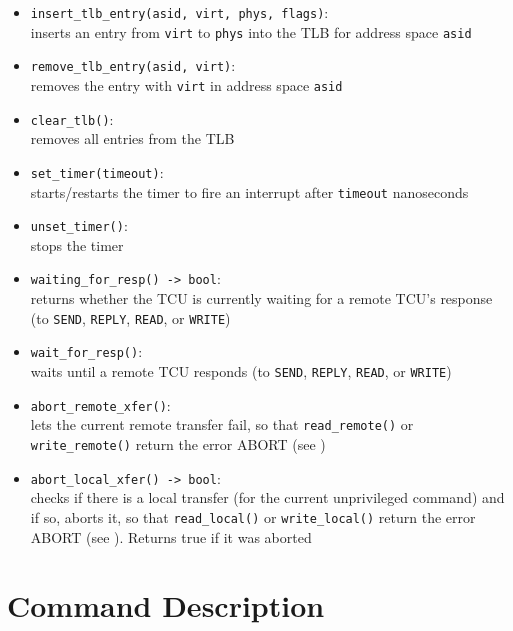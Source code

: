 \begin{itemize}
  \item \texttt{insert\_tlb\_entry(asid, virt, phys, flags)}: \\
  inserts an entry from \texttt{virt} to \texttt{phys} into the TLB for address space \texttt{asid}
  \item \texttt{remove\_tlb\_entry(asid, virt)}:\\
  removes the entry with \texttt{virt} in address space \texttt{asid}
  \item \texttt{clear\_tlb()}:\\
  removes all entries from the TLB \extend{}
  \item \texttt{set\_timer(timeout)}:\\
  starts/restarts the timer to fire an interrupt after \texttt{timeout} nanoseconds
  \item \texttt{unset\_timer()}:\\
  stops the timer
  \item \texttt{waiting\_for\_resp() -> bool}:\\
  returns whether the TCU is currently waiting for a remote TCU's response (to \texttt{SEND},
  \texttt{REPLY}, \texttt{READ}, or \texttt{WRITE})
  \item \texttt{wait\_for\_resp()}:\\
  waits until a remote TCU responds (to \texttt{SEND}, \texttt{REPLY}, \texttt{READ}, or
  \texttt{WRITE})
  \item \texttt{abort\_remote\_xfer()}:\\
  lets the current remote transfer fail, so that \texttt{read\_remote()} or \texttt{write\_remote()}
  return the error ABORT (see )
  \item \texttt{abort\_local\_xfer() -> bool}:\\
  checks if there is a local transfer (for the current unprivileged command) and if so, aborts it,
  so that \texttt{read\_local()} or \texttt{write\_local()} return the error ABORT (see
  ). Returns true if it was aborted
\end{itemize}

\section{Command Description}


